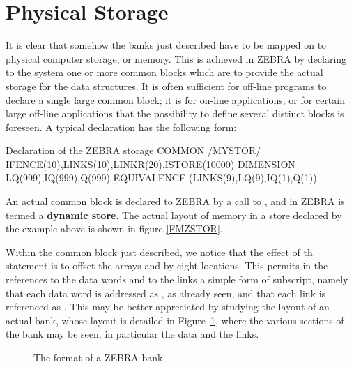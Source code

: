 \section{Physical Storage}

It is clear that somehow the banks just described have to be mapped on
to physical computer storage, or memory.
This is achieved in ZEBRA by declaring to the system one or more common
blocks which are to provide the actual storage for the data structures.
It is often sufficient for off-line programs to declare a single large
common block; it is for on-line applications, or for certain large
off-line applications that the possibility to define several distinct
blocks is foreseen. A typical declaration has the following form:
\newpage
\begin{XMPt}{Declaration of the ZEBRA storage}
      COMMON /MYSTOR/ IFENCE(10),LINKS(10),LINKR(20),ISTORE(10000)
      DIMENSION     LQ(999),IQ(999),Q(999)
      EQUIVALENCE  (LINKS(9),LQ(9),IQ(1),Q(1))
\end{XMPt}
An actual common block is declared to ZEBRA by a call to ,
and in ZEBRA is termed a {\bf dynamic store}.
The actual layout of memory in a store declared by the example above is shown
in figure \ref{FMZSTOR}.

\begin{Fighere}
\begin{center}
\mbox{}
\end{center}
\caption{The layout of the ZEBRA default store}
\label{FMZSTOR}
\end{Fighere}

Within the common block just described, we notice that the effect of th
 statement is to offset the arrays  and 
 by eight locations. 
This permits in the references to the data words and to the
links a simple form of subscript, namely that each data word is
addressed as , 
as already seen, and that each link is referenced as . 
This may be better appreciated by studying the layout of an
actual bank, whose layout is detailed in Figure~\ref{BNKFORM},
where the various sections of the bank may be seen, in particular the
data and the links.

\begin{figure}[p]
\begin{center}
\mbox{}
\end{center}
\caption{The format of a ZEBRA bank}
\label{BNKFORM}
\end{figure}

